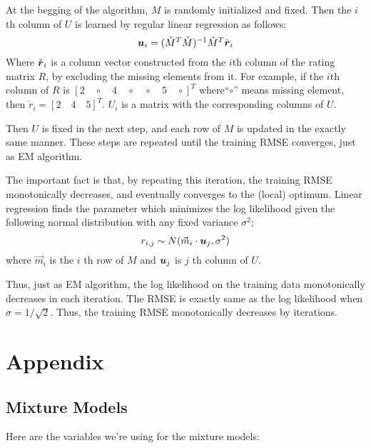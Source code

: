 \documentclass{article}
\begin{document}
At the begging of the algorithm, $M$ is randomly initialized and fixed. Then the $i$th column of $U$ is learned by regular linear regression as follows;
\begin{equation}
\mbox{\boldmath $u$}_i=(\check{M}^T\check{M})^{-1}\check{M}^T \check{\mbox{\boldmath $r$}}_i
\end{equation}
Where $\check{\mbox{\boldmath $r$}}_i$ is a column vector constructed from the $i$th column of the rating matrix $R$, by excluding the missing elements from it. For example, if the $i$th column of $R$ is $[2 \quad \circ \quad 4 \quad \circ \quad \circ \quad 5 \quad \circ]^T$ where``$\circ$'' means missing element, then $\check{r}_i = [2 \quad 4 \quad 5]^T$. $U_i$ is a matrix with the corresponding columns of $U$.

Then $U$ is fixed in the next step, and each row of $M$ is updated in the exactly same manner. These steps are repeated until the training RMSE converges, just as EM algorithm. 

The important fact is that, by repeating this iteration, the training RMSE monotonically decreases, and eventually converges to the (local) optimum. Linear regression finds the parameter which minimizes the log likelihood given the following normal distribution with any fixed variance $\sigma^2$;
\begin{equation}
r_{i,j}\sim N(\vec{m}_i \cdot {\mbox{\boldmath $u$}}_j, \sigma^2)
\end{equation}
where $\vec{m}_i$ is the $i$ th row of $M$ and ${\mbox{\boldmath $u$}}_j$ is $j$ th column of $U$.

Thus, just as EM algorithm, the log likelihood on the training data monotonically decreases in each iteration. The RMSE is exactly same as the log likelihood when $\sigma = 1/\sqrt{2}$. Thus, the training RMSE monotonically decreases by iterations.




\section{Appendix}

\subsection{Mixture Models}

Here are the variables we're using for the mixture models:
\end{document}
